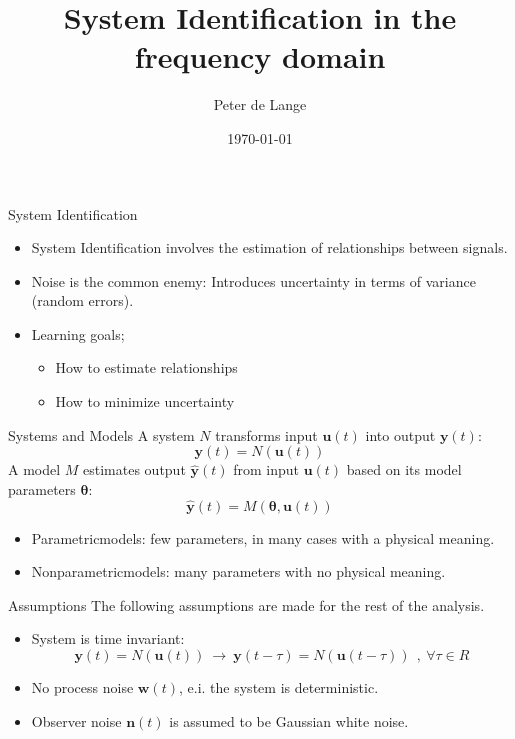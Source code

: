 \documentclass{beamer}
\title{System Identification in the frequency domain}
\author{Peter de Lange}
\institute{UC DAVIS}
\date{\today}
\begin{document}
\begin{frame}
		\titlepage
\end{frame}

\begin{frame}{System Identification}
				\begin{itemize}
				\item System Identification involves the estimation of relationships between signals.
				\item Noise is the common enemy: Introduces uncertainty in terms of variance (random errors).
				\item Learning goals;
						\begin{itemize}
						\item How to estimate relationships
						\item How to minimize uncertainty
						\end{itemize}
		\end{itemize}
\end{frame}

\begin{frame}{Systems and Models}
A system ${N}$ transforms input $\mathbf{u}(t)$ into output $\mathbf{y}(t)$:
		\begin{equation}
		\mathbf{y}(t) = {N}(\mathbf{u}(t))
		\end{equation}
A model ${M}$ estimates output $\mathbf{\hat{y}}(t)$ from input $\mathbf{u}(t)$ based on its model parameters $\boldsymbol{\theta}$:
		\begin{equation}
		\mathbf{\hat{y}}(t) = {M}(\boldsymbol{\theta},\mathbf{u}(t))
		\end{equation}
		\begin{itemize}
		\item Parametricmodels: few parameters, in many cases with a physical meaning.
		\item Nonparametricmodels: many parameters with no physical meaning.
		\end{itemize}
\end{frame}

\begin{frame}{Assumptions}
		The following assumptions are made for the rest of the analysis.
		\begin{itemize}
		\item	System is time invariant:
		\begin{equation}
		\mathbf{y}(t) = N(\mathbf{u}(t)) \  \rightarrow \ \mathbf{y}(t-\tau) = N(\mathbf{u}(t-\tau)) \ \ , \ \forall \tau \in R
		\end{equation}
		\item No process noise $\mathbf{w}(t)$, e.i. the system is deterministic.
		\item Observer noise $\mathbf{n}(t)$ is assumed to be Gaussian white noise.
		\end{itemize}
\end{frame}
\end{document}
